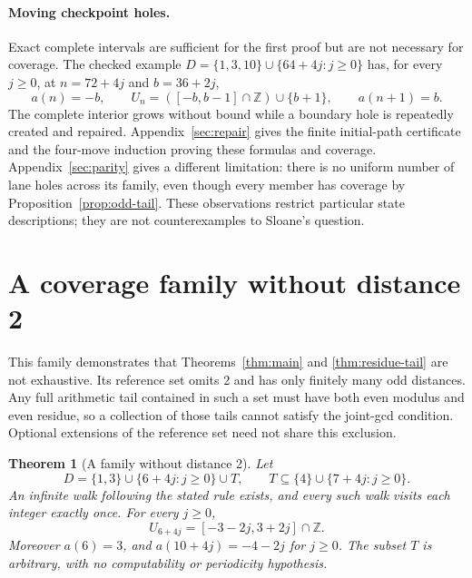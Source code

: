 \documentclass[11pt,a4paper]{article}
\newtheorem{theorem}{Theorem}
\newcommand{\Z}{\mathbb Z}\newcommand{\N}{\mathbb N}
\begin{document}
\paragraph{Moving checkpoint holes.}\label{rem:moving-hole}
Exact complete intervals are sufficient for the first proof but are not
necessary for coverage. The checked example
$D=\{1,3,10\}\cup\{64+4j:j\ge0\}$ has, for every $j\ge0$,
at $n=72+4j$ and $b=36+2j$,
\[
 a(n)=-b,\qquad U_n=([-b,b-1]\cap\Z)\cup\{b+1\},\qquad a(n+1)=b.
\]
The complete interior grows without bound while a boundary hole is repeatedly
created and repaired. Appendix~\ref{sec:repair} gives the finite initial-path certificate and the
four-move induction proving these formulas and coverage. Appendix~\ref{sec:parity} gives a different limitation: there
is no uniform number of lane holes across its family, even though every
member has coverage by Proposition~\ref{prop:odd-tail}. These observations
restrict particular state descriptions; they are not counterexamples to
Sloane's question.

\appendix

\section{A coverage family without distance 2}\label{sec:triple}
This family demonstrates that Theorems~\ref{thm:main} and
\ref{thm:residue-tail} are not exhaustive. Its reference set omits 2 and
has only finitely many odd distances. Any full arithmetic tail contained
in such a set must have both even modulus and even residue, so a collection
of those tails cannot satisfy the joint-gcd condition. Optional extensions
of the reference set need not share this exclusion.

\begin{theorem}[A family without distance 2]\label{thm:triple}
Let
\[
 D=\{1,3\}\cup\{6+4j:j\ge0\}\cup T,
 \qquad T\subseteq\{4\}\cup\{7+4j:j\ge0\}.
\]
An infinite walk following the stated rule exists, and every such walk
visits each integer exactly once. For every $j\ge0$,
\[
 U_{6+4j}=[-3-2j,3+2j]\cap\Z.
\]
Moreover $a(6)=3$, and $a(10+4j)=-4-2j$ for $j\ge0$.
The subset $T$ is arbitrary, with no computability or periodicity hypothesis.
\end{theorem}
\end{document}
